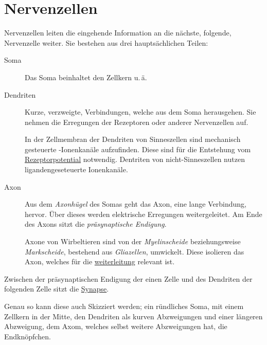 \documentclass{article}
\begin{document}
\section{Nervenzellen}
Nervenzellen leiten die eingehende Information an die nächste, folgende, Nervenzelle weiter. Sie bestehen aus drei hauptsächlichen Teilen:
\begin{description}
 \item[Soma] Das Soma beinhaltet den Zellkern u.\,ä.
 \item[Dendriten] Kurze, verzweigte, Verbindungen, welche aus dem Soma herausgehen. Sie nehmen die Erregungen der Rezeptoren oder anderer Nervenzellen auf.
 
In der Zellmembran der Dendriten von Sinneszellen sind mechanisch gesteuerte -Ionenkanäle aufzufinden. Diese sind für die Entstehung vom \hyperref[Das Rezeptorpotential]{Rezeptorpotential} notwendig. Dentriten von nicht-Sinneszellen nutzen ligandengeseteuerte Ionenkanäle.
 \item[Axon] Aus dem \emph{Axonhügel} des Somas geht das Axon, eine lange Verbindung, hervor. Über dieses werden elektrische Erregungen weitergeleitet. Am Ende des Axons sitzt die \emph{präsynaptische Endigung}.
 
Axone von Wirbeltieren sind von der \emph{Myelinscheide} beziehungsweise \emph{Markscheide}, bestehend aus \emph{Gliazellen}, umwickelt. Diese isolieren das Axon, welches für die \hyperref[Die Weiterleitung]{weiterleitung} relevant ist.
\end{description}
Zwischen der präsynaptischen Endigung der einen Zelle und des Dendriten der folgenden Zelle sitzt die \hyperref[Synapsen]{Synapse}. 
 
Genau so kann diese auch Skizziert werden; ein ründliches Soma, mit einem Zellkern in der Mitte, den Dendriten als kurven Abzweigungen und einer längeren Abzweigung, dem Axom, welches selbst weitere Abzweigungen hat, die Endknöpfchen.
\end{document}
